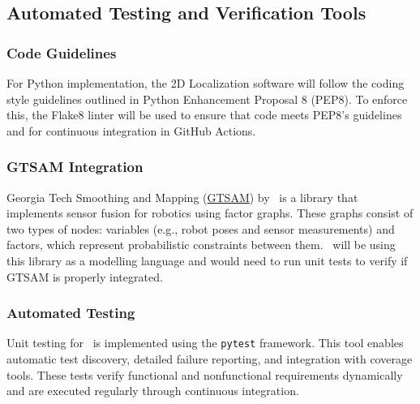 \documentclass[12pt, titlepage]{article}
\begin{document}



\subsection{Automated Testing and Verification Tools}\label{plan_auto}

\subsubsection{Code Guidelines}
For Python implementation, the 2D Localization software will follow the coding style guidelines outlined in Python Enhancement Proposal 8 (PEP8). To enforce this, the Flake8 linter will be used to ensure that code meets PEP8's guidelines and for continuous integration in GitHub Actions.

\subsubsection{GTSAM Integration}
Georgia Tech Smoothing and Mapping (\href{https://github.com/borglab/gtsam}{GTSAM}) by~\cite{gtsam2022} is a library that implements sensor fusion for robotics using factor graphs. These graphs consist of two types of nodes: variables (e.g., robot poses and sensor measurements) and factors, which represent probabilistic constraints between them. \progname~will be using this library as a modelling language and would need to run unit tests to verify if GTSAM is properly integrated.

\subsubsection{Automated Testing}
Unit testing for \progname~is implemented using the \texttt{pytest} framework. This tool enables automatic test discovery, detailed failure reporting, and integration with coverage tools. These tests verify functional and nonfunctional requirements dynamically and are executed regularly through continuous integration.
\end{document}
